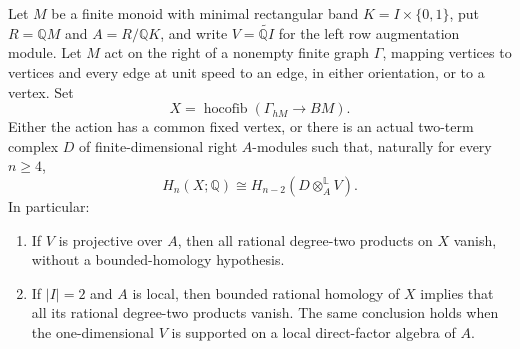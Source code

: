 \begin{theorem}
\label{C:two-column-graph-localization}
Let $M$ be a finite monoid with minimal rectangular band
$K=I\times\{0,1\}$, put $R=\mathbb QM$ and
$A=R/\mathbb QK$, and write
$V=\widetilde{\mathbb QI}$ for the left row augmentation module.
Let $M$ act on the right of a nonempty finite graph $\Gamma$,
mapping vertices to vertices and every edge at unit speed to an
edge, in either orientation, or to a vertex.  Set
\[
 X=\operatorname{hocofib}(\Gamma_{hM}\to BM).
\]
Either the action has a common fixed vertex, or there is an actual
two-term complex $D$ of finite-dimensional right $A$-modules such
that, naturally for every $n\geq4$,
\[
 H_n(X;\mathbb Q)
   \cong H_{n-2}(D\otimes_A^{\mathbb L}V).
\]
In particular:
\begin{enumerate}
\item If $V$ is projective over $A$, then all rational degree-two
products on $X$ vanish, without a bounded-homology hypothesis.
\item If $|I|=2$ and $A$ is local, then bounded rational homology
of $X$ implies that all its rational degree-two products vanish.
The same conclusion holds when the one-dimensional $V$ is
supported on a local direct-factor algebra of $A$.
\end{enumerate}
\end{theorem}
